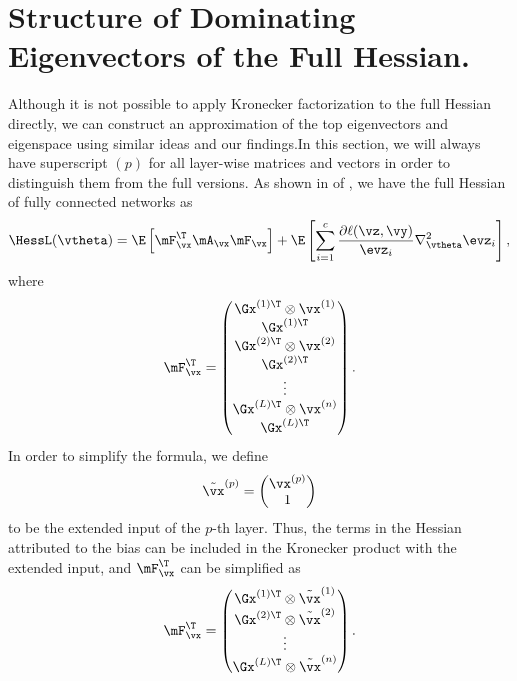 \section{Structure of Dominating Eigenvectors of the Full Hessian.}

\label{sec:appendix_full_hessian}
Although it is not possible to apply Kronecker factorization to the full Hessian directly, we can construct an approximation of the top eigenvectors and eigenspace using similar ideas and our findings.In this section, we will always have superscript $(p)$ for all layer-wise matrices and vectors in order to distinguish them from the full versions.
As shown in  of , we have the full Hessian of fully connected networks as 
\begin{equation}
    \HessL(\vtheta) = \E \left[\mF^\T_{\vx}\mA_\vx\mF_{\vx}\right] + \E\left[\sum_{i=1}^c \frac{\partial \ell(\vz,\vy)}{\evz_i} \nabla^2_\vtheta \evz_i \right],
\label{eqn:app_full_hessian_2}
\end{equation}
where
\begin{align}
    \mF^\T_\vx = \begin{pmatrix}
    \Gx^{(1)\T} \otimes \vx^{(1)}\\
    \Gx^{(1)\T}\\
    \Gx^{(2)\T} \otimes \vx^{(2)}\\
    \Gx^{(2)\T}\\
    \vdots\\
    \Gx^{(L)\T} \otimes \vx^{(n)}\\
    \Gx^{(L)\T}
    \end{pmatrix}.
\end{align}
In order to simplify the formula, we define \begin{equation}
    \tilde{\vx}^{(p)} = \begin{pmatrix}
    \vx^{(p)}\\
    1
    \end{pmatrix}
\end{equation} to be the extended input of the $p$-th layer. Thus, the terms in the Hessian attributed to the bias can be included in the Kronecker product with the extended input, and $\mF_\vx^\T$ can be simplified as
\begin{align}
\label{eqn:app_f_extened}
    \mF^\T_\vx = \begin{pmatrix}
    \Gx^{(1)\T} \otimes \tilde{\vx}^{(1)}\\
    \Gx^{(2)\T} \otimes \tilde{\vx}^{(2)}\\
    \vdots\\
    \Gx^{(L)\T} \otimes \tilde{\vx}^{(n)}\\
    \end{pmatrix}.
\end{align}

